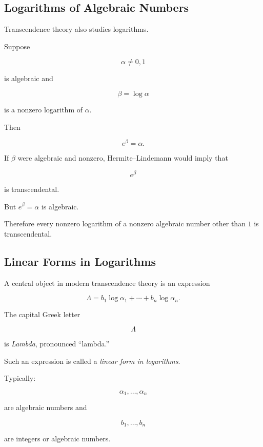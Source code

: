\subsection{Logarithms of Algebraic Numbers}
\label{subsec:logarithms-algebraic-numbers}

Transcendence theory also studies logarithms.

Suppose

\[ \alpha\neq0,1 \]

is algebraic and

\[ \beta=\log\alpha \]

is a nonzero logarithm of \(\alpha\).

Then

\[ e^\beta=\alpha. \]

If \(\beta\) were algebraic and nonzero, Hermite--Lindemann would imply that

\[ e^\beta \]

is transcendental.

But \(e^\beta=\alpha\) is algebraic.

Therefore every nonzero logarithm of a nonzero algebraic number other than
\(1\) is transcendental.

\subsection{Linear Forms in Logarithms}
\label{subsec:linear-forms-logarithms}

A central object in modern transcendence theory is an expression

\[ \Lambda=b_1\log\alpha_1+\cdots+b_n\log\alpha_n. \]

The capital Greek letter

\[ \Lambda \]

is \emph{Lambda}, pronounced ``lambda.''

Such an expression is called a \emph{linear form in logarithms}.

Typically:

\[
\alpha_1,\ldots,\alpha_n
\]

are algebraic numbers and

\[
b_1,\ldots,b_n
\]

are integers or algebraic numbers.

